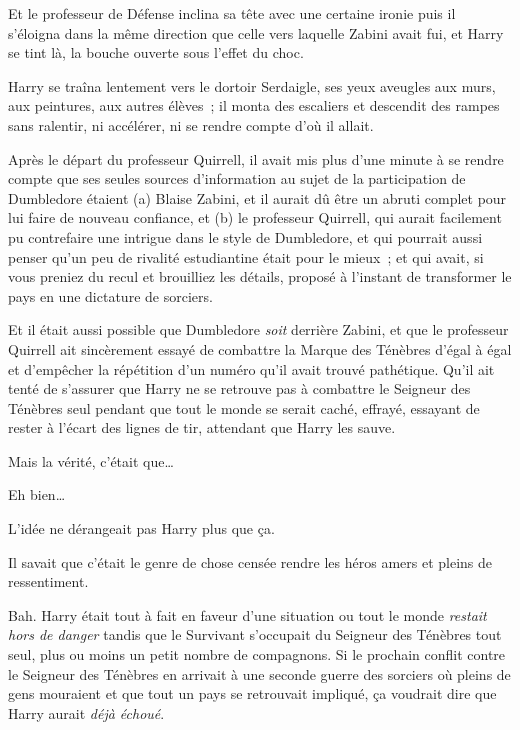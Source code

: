 Et le professeur de Défense inclina sa tête avec une certaine ironie puis il s'éloigna dans la même direction que celle vers laquelle Zabini avait fui, et Harry se tint là, la bouche ouverte sous l'effet du choc.


Harry se traîna lentement vers le dortoir Serdaigle, ses yeux aveugles aux murs, aux peintures, aux autres élèves~; il monta des escaliers et descendit des rampes sans ralentir, ni accélérer, ni se rendre compte d'où il allait.

Après le départ du professeur Quirrell, il avait mis plus d'une minute à se rendre compte que ses seules sources d'information au sujet de la participation de Dumbledore étaient (a) Blaise Zabini, et il aurait dû être un abruti complet pour lui faire de nouveau confiance, et (b) le professeur Quirrell, qui aurait facilement pu contrefaire une intrigue dans le style de Dumbledore, et qui pourrait aussi penser qu'un peu de rivalité estudiantine était pour le mieux~; et qui avait, si vous preniez du recul et brouilliez les détails, proposé à l'instant de transformer le pays en une dictature de sorciers.

Et il était aussi possible que Dumbledore \emph{soit} derrière Zabini, et que le professeur Quirrell ait sincèrement essayé de combattre la Marque des Ténèbres d'égal à égal et d'empêcher la répétition d'un numéro qu'il avait trouvé pathétique.
Qu'il ait tenté de s'assurer que Harry ne se retrouve pas à combattre le Seigneur des Ténèbres seul pendant que tout le monde se serait caché, effrayé, essayant de rester à l'écart des lignes de tir, attendant que Harry les sauve.

Mais la vérité, c'était que…

Eh bien…

L'idée ne dérangeait pas Harry plus que ça.

Il savait que c'était le genre de chose censée rendre les héros amers et pleins de ressentiment.

Bah. Harry était tout à fait en faveur d'une situation ou tout le monde \emph{restait hors de danger} tandis que le Survivant s'occupait du Seigneur des Ténèbres tout seul, plus ou moins un petit nombre de compagnons.
Si le prochain conflit contre le Seigneur des Ténèbres en arrivait à une seconde guerre des sorciers où pleins de gens mouraient et que tout un pays se retrouvait impliqué, ça voudrait dire que Harry aurait \emph{déjà échoué}.

